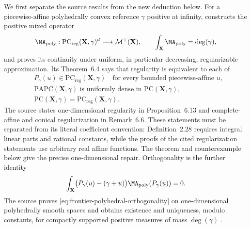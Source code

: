 We first separate the source results from the new deduction below.  For a
piecewise-affine polyhedrally convex reference \(\gamma\) positive at
infinity, \cite[Theorem~4.13 and Proposition~4.16]{BMPS26} constructs the
positive mixed operator
\[
 \MA_{\mathrm{poly}}:
 \mathrm{PC}_{\mathrm{reg}}(\mathbf X,\gamma)^d
 \longrightarrow\mathcal M^+(\mathbf X),
 \qquad
 \int_{\mathbf X}\MA_{\mathrm{poly}}=\deg(\gamma),
\]
and proves its continuity under uniform, in particular decreasing,
regularizable approximation.  Its Theorem~6.4 says that regularity is
equivalent to each of
\[
 \begin{split}
 &P_\gamma(u)\in\mathrm{PC}_{\mathrm{reg}}(\mathbf X,\gamma)
       \quad\text{for every bounded piecewise-affine }u,\\
 &\mathrm{PAPC}(\mathbf X,\gamma)
       \text{ is uniformly dense in }\mathrm{PC}(\mathbf X,\gamma),\\
 &\mathrm{PC}(\mathbf X,\gamma)
       =\mathrm{PC}_{\mathrm{reg}}(\mathbf X,\gamma).
 \end{split}
\]
The source states one-dimensional regularity in Proposition~6.13 and
complete-affine and conical regularization in Remark~6.6.  These statements
must be separated from its literal coefficient convention: Definition~2.28
requires integral linear parts and rational constants, while the proofs of
the cited regularization statements use arbitrary real affine functions.
The theorem and counterexample below give the precise one-dimensional
repair.  Orthogonality is the further
identity
\begin{equation}
 \int_{\mathbf X}
 \bigl(P_\gamma(u)-(\gamma+u)\bigr)
 \MA_{\mathrm{poly}}(P_\gamma(u))=0.
 \label{eq:frontier-polyhedral-orthogonality}
\end{equation}
The source proves \eqref{eq:frontier-polyhedral-orthogonality} on
one-dimensional polyhedrally smooth spaces and obtains existence and
uniqueness, modulo constants, for compactly supported positive measures of
mass \(\deg(\gamma)\)
\cite[Proposition~6.21 and Theorem~6.22]{BMPS26}.




